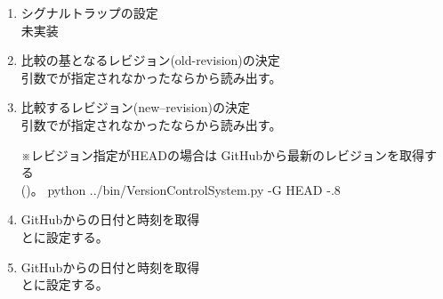 \begin{Process}
\begin{enumerate}
  \item	シグナルトラップの設定\\
	未実装
	\medskip

  \item	比較の基となるレビジョン(old-revision)の決定\\
	引数でが指定されなかったならから読み出す。
	\medskip

  \item	比較するレビジョン(new--revision)の決定\\
	引数でが指定されなかったならから読み出す。\\
	\vspace{.3\baselineskip}
	\begin{minipage}[t]{\linewidth}
	\small{\noindent ※\hspace{1em}レビジョン指定がHEADの場合は
		GitHubから最新のレビジョンを取得する}\\
	\small{\phantom{※}\hspace{1em}()。}
	\addtolength{\linewidth}{-20pt}
	     {python ../bin/VersionControlSystem.py -G HEAD}
	     {-.8\baselineskip}
	\end{minipage}
	\addtolength{\linewidth}{20pt}
	\medskip

  \item	GitHubからの日付と時刻を取得\\
	とに設定する。
	\medskip

  \item	GitHubからの日付と時刻を取得\\
	とに設定する。
	\medskip


\end{enumerate}
\end{Process}
